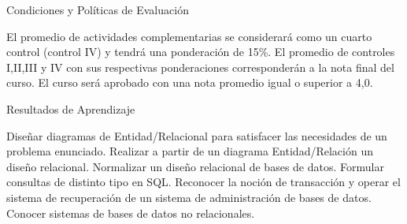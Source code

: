 \documentclass{beamer}
\begin{document}
  \begin{frame}{Condiciones y Políticas de Evaluación}
  \small
  \begin{outline}
   \1 El promedio de actividades complementarias se considerará como un cuarto control (control IV) y tendrá una ponderación de 15\%. El promedio de controles I,II,III y IV con sus respectivas ponderaciones corresponderán a la nota final del curso. El curso será aprobado con una nota promedio igual o superior a 4,0.
    
    
\end{outline}

  \end{frame}
  
  \begin{frame}{Resultados de Aprendizaje}
  	\begin{outline}
		\1 Diseñar diagramas de Entidad/Relacional para satisfacer las necesidades de un problema enunciado.
		\1  Realizar a partir de un diagrama Entidad/Relación un diseño relacional.
		\1 Normalizar un diseño relacional de bases de datos.
		\1 Formular consultas de distinto tipo en SQL.
		\1 Reconocer la noción de transacción y operar el sistema de recuperación de un sistema de administración de bases de datos.
		\1 Conocer sistemas de bases de datos no relacionales.
	\end{outline}
  \end{frame}
  
\end{document}
